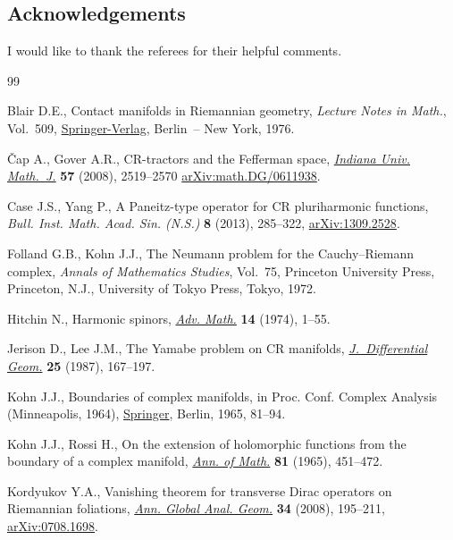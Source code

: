 \documentclass[10pt,a4paper]{amsart}
\numberwithin{equation}{section}
\begin{document}
\subsection*{Acknowledgements}

I would like to thank the referees for their helpful comments.


\begin{thebibliography}{99}
\footnotesize\itemsep=0pt

Blair D.E., Contact manifolds in {R}iemannian geometry, \textit{Lecture Notes
 in Math.}, Vol.~509, \href{https://doi.org/10.1007/BFb0079307}{Springer-Verlag}, Berlin~-- New York, 1976.


\v{C}ap A., Gover A.R., C{R}-tractors and the {F}efferman space,
 \href{https://doi.org/10.1512/iumj.2008.57.3359}{\textit{Indiana Univ. Math.~J.}} \textbf{57} (2008), 2519--2570 \href{https://arxiv.org/abs/math.DG/0611938}{arXiv:math.DG/0611938}.

Case J.S., Yang P., A {P}aneitz-type operator for {CR} pluriharmonic functions,
 \textit{Bull. Inst. Math. Acad. Sin. (N.S.)} \textbf{8} (2013), 285--322,
 \href{https://arxiv.org/abs/1309.2528}{arXiv:1309.2528}.

Folland G.B., Kohn J.J., The {N}eumann problem for the {C}auchy--{R}iemann
 complex, \textit{Annals of Mathematics Studies}, Vol.~75, Princeton
 University Press, Princeton, N.J., University of Tokyo Press, Tokyo, 1972.

Hitchin N., Harmonic spinors, \href{https://doi.org/10.1016/0001-8708(74)90021-8}{\textit{Adv. Math.}} \textbf{14} (1974), 1--55.

Jerison D., Lee J.M., The {Y}amabe problem on {CR} manifolds,
 \href{https://doi.org/10.4310/jdg/1214440849}{\textit{J.~Differential Geom.}} \textbf{25} (1987), 167--197.

Kohn J.J., Boundaries of complex manifolds, in Proc. {C}onf. {C}omplex
 {A}nalysis ({M}inneapolis, 1964), \href{https://doi.org/10.1007/978-3-642-48016-4_9}{Springer}, Berlin, 1965, 81--94.

Kohn J.J., Rossi H., On the extension of holomorphic functions from the
 boundary of a complex manifold, \href{https://doi.org/10.2307/1970624}{\textit{Ann. of Math.}} \textbf{81} (1965),
 451--472.

Kordyukov Y.A., Vanishing theorem for transverse {D}irac operators on
 {R}iemannian foliations, \href{https://doi.org/10.1007/s10455-008-9103-2}{\textit{Ann. Global Anal. Geom.}} \textbf{34} (2008),
 195--211, \href{https://arxiv.org/abs/0708.1698}{arXiv:0708.1698}.


\end{thebibliography}
\end{document}
